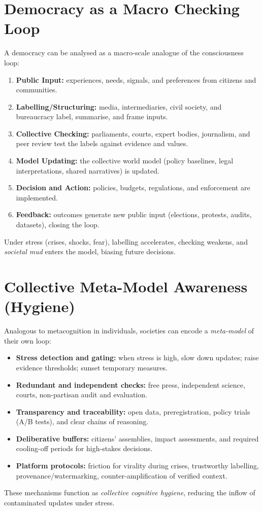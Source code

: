 \documentclass[11pt,a4paper]{article}
\begin{document}
\section{Democracy as a Macro Checking Loop}
A democracy can be analysed as a macro-scale analogue of the consciousness loop:
\begin{enumerate}[label=\textbf{\arabic*.}]
  \item \textbf{Public Input:} experiences, needs, signals, and preferences from citizens and communities.
  \item \textbf{Labelling/Structuring:} media, intermediaries, civil society, and bureaucracy label, summarise, and frame inputs.
  \item \textbf{Collective Checking:} parliaments, courts, expert bodies, journalism, and peer review test the labels against evidence and values.
  \item \textbf{Model Updating:} the collective world model (policy baselines, legal interpretations, shared narratives) is updated.
  \item \textbf{Decision and Action:} policies, budgets, regulations, and enforcement are implemented.
  \item \textbf{Feedback:} outcomes generate new public input (elections, protests, audits, datasets), closing the loop.
\end{enumerate}
\noindent Under stress (crises, shocks, fear), labelling accelerates, checking weakens, and \emph{societal mud} enters the model, biasing future decisions.

\section{Collective Meta-Model Awareness (Hygiene)}
Analogous to metacognition in individuals, societies can encode a \emph{meta-model} of their own loop:
\begin{itemize}
  \item \textbf{Stress detection and gating:} when stress is high, slow down updates; raise evidence thresholds; sunset temporary measures.
  \item \textbf{Redundant and independent checks:} free press, independent science, courts, non-partisan audit and evaluation.
  \item \textbf{Transparency and traceability:} open data, preregistration, policy trials (A/B tests), and clear chains of reasoning.
  \item \textbf{Deliberative buffers:} citizens' assemblies, impact assessments, and required cooling-off periods for high-stakes decisions.
  \item \textbf{Platform protocols:} friction for virality during crises, trustworthy labelling, provenance/watermarking, counter-amplification of verified context.
\end{itemize}
These mechanisms function as \emph{collective cognitive hygiene}, reducing the inflow of contaminated updates under stress.
\end{document}
